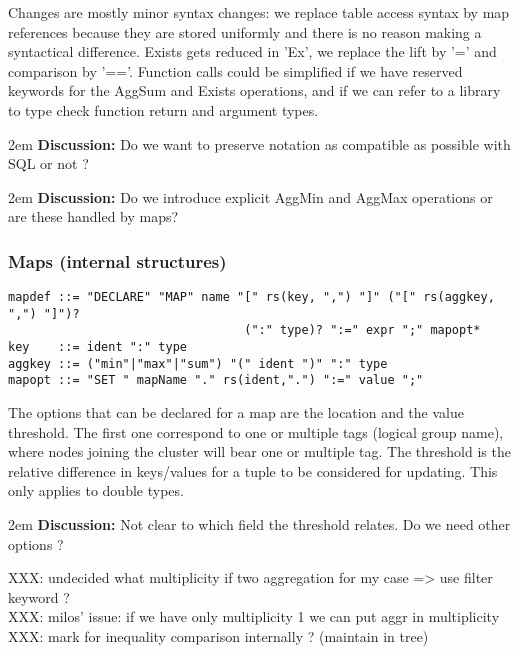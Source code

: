 \documentclass[11pt]{article}
\def\discuss#1{\begingroup\par\leftskip2em {\footnotesize {\bf Discussion:} #1} \par\endgroup}
\begin{document}
Changes are mostly minor syntax changes: we replace table access syntax by map references because they are stored uniformly and there is no reason making a syntactical difference. Exists gets reduced in 'Ex', we replace the lift by '=' and comparison by '=='. Function calls could be simplified if we have reserved keywords for the AggSum and Exists operations, and if we can refer to a library to type check function return and argument types.
\discuss{Do we want to preserve notation as compatible as possible with SQL or not ?}
\discuss{Do we introduce explicit AggMin and AggMax operations or are these handled by maps?}

\subsubsection*{Maps (internal structures)}
\begin{verbatim}
mapdef ::= "DECLARE" "MAP" name "[" rs(key, ",") "]" ("[" rs(aggkey, ",") "]")? 
                                 (":" type)? ":=" expr ";" mapopt*
key    ::= ident ":" type
aggkey ::= ("min"|"max"|"sum") "(" ident ")" ":" type
mapopt ::= "SET " mapName "." rs(ident,".") ":=" value ";"
\end{verbatim}

The options that can be declared for a map are the location and the value threshold. The first one correspond to one or multiple tags (logical group name), where nodes joining the cluster will bear one or multiple tag. The threshold is the relative difference in keys/values for a tuple to be considered for updating. This only applies to double types. \discuss{Not clear to which field the threshold relates. Do we need other options ?}

{\color{red}
XXX: undecided what multiplicity if two aggregation for my case => use filter keyword ?\\
XXX: milos' issue: if we have only multiplicity 1 we can put aggr in multiplicity\\
XXX: mark for inequality comparison internally ? (maintain in tree)
}
\end{document}

